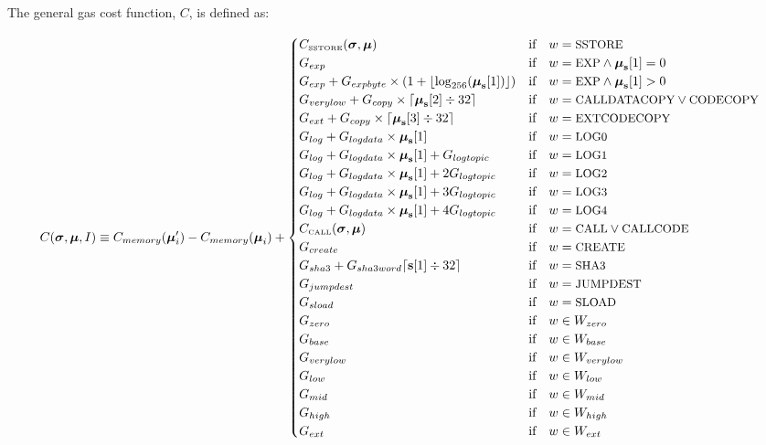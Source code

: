 \documentclass[9pt,oneside]{amsart}
\begin{document}
The general gas cost function, $C$, is defined as:

\begin{equation}
C(\boldsymbol{\sigma}, \boldsymbol{\mu}, I) \equiv C_{memory}(\boldsymbol{\mu}'_i)-C_{memory}(\boldsymbol{\mu}_i) + \begin{cases}
C_\text{\tiny SSTORE}(\boldsymbol{\sigma}, \boldsymbol{\mu}) & \text{if} \quad w = \text{\small SSTORE} \\
G_{exp} & \text{if} \quad w = \text{\small EXP} \wedge \boldsymbol{\mu}_\mathbf{s}[1] = 0 \\
G_{exp} + G_{expbyte}\times(1+\lfloor\log_{256}(\boldsymbol{\mu}_\mathbf{s}[1])\rfloor) & \text{if} \quad w = \text{\small EXP} \wedge \boldsymbol{\mu}_\mathbf{s}[1] > 0 \\
G_{verylow} + G_{copy}\times\lceil\boldsymbol{\mu}_\mathbf{s}[2] \div 32\rceil & \text{if} \quad w = \text{\small CALLDATACOPY} \lor \text{\small CODECOPY} \\
G_{ext} + G_{copy}\times\lceil\boldsymbol{\mu}_\mathbf{s}[3] \div 32\rceil & \text{if} \quad w = \text{\small EXTCODECOPY} \\
G_{log}+G_{logdata}\times\boldsymbol{\mu}_\mathbf{s}[1] & \text{if} \quad w = \text{\small LOG0} \\
G_{log}+G_{logdata}\times\boldsymbol{\mu}_\mathbf{s}[1]+G_{logtopic} & \text{if} \quad w = \text{\small LOG1} \\
G_{log}+G_{logdata}\times\boldsymbol{\mu}_\mathbf{s}[1]+2G_{logtopic} & \text{if} \quad w = \text{\small LOG2} \\
G_{log}+G_{logdata}\times\boldsymbol{\mu}_\mathbf{s}[1]+3G_{logtopic} & \text{if} \quad w = \text{\small LOG3} \\
G_{log}+G_{logdata}\times\boldsymbol{\mu}_\mathbf{s}[1]+4G_{logtopic} & \text{if} \quad w = \text{\small LOG4} \\
C_\text{\tiny CALL}(\boldsymbol{\sigma}, \boldsymbol{\mu}) & \text{if} \quad w = \text{\small CALL} \lor \text{\small CALLCODE} \\
G_{create} & \text{if} \quad w = \text{\small CREATE}\\
G_{sha3}+G_{sha3word} \lceil \mathbf{s}[1] \div 32 \rceil & \text{if} \quad w = \text{\small SHA3}\\
G_{jumpdest} & \text{if} \quad w = \text{\small JUMPDEST}\\
G_{sload} & \text{if} \quad w = \text{\small SLOAD}\\
G_{zero} & \text{if} \quad w \in W_{zero}\\
G_{base} & \text{if} \quad w \in W_{base}\\
G_{verylow} & \text{if} \quad w \in W_{verylow}\\
G_{low} & \text{if} \quad w \in W_{low}\\
G_{mid} & \text{if} \quad w \in W_{mid}\\
G_{high} & \text{if} \quad w \in W_{high}\\
G_{ext} & \text{if} \quad w \in W_{ext}
\end{cases}
\end{equation}
\end{document}

